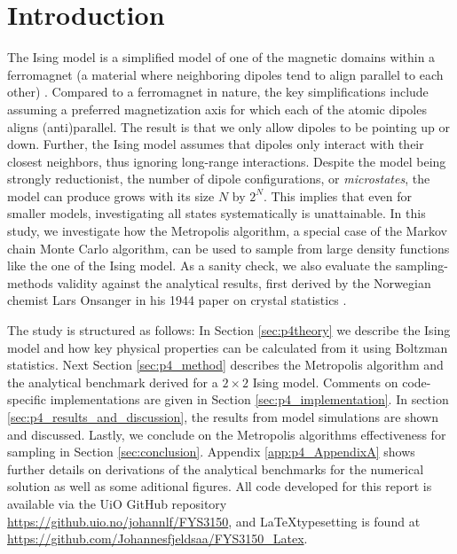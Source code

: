 \documentclass[../main_proj4_correct_template.tex]{subfiles}
\begin{document}
\section{Introduction}\label{Introduction}


The Ising model is a simplified model of one of the magnetic domains within a ferromagnet (a material where neighboring dipoles tend to align parallel to each other) \cite{thermal_physics}. Compared to a ferromagnet in nature, the key simplifications include assuming a preferred magnetization axis for which each of the atomic dipoles aligns (anti)parallel. The result is that we only allow dipoles to be pointing up or down. Further, the Ising model assumes that dipoles only interact with their closest neighbors, thus ignoring long-range interactions. Despite the model being strongly reductionist, the number of dipole configurations, or \textit{microstates}, the model can produce grows with its size $N$ by $2^{N}$. This implies that even for smaller models, investigating all states systematically is unattainable. In this study, we investigate how the Metropolis algorithm, a special case of the Markov chain Monte Carlo algorithm, can be used to sample from large density functions like the one of the Ising model. As a sanity check, we also evaluate the sampling-methods validity against the analytical results, first derived by the Norwegian chemist Lars Onsanger in his 1944 paper on crystal statistics \cite{onsanger_crystal_stat}.

The study is structured as follows: In Section \ref{sec:p4theory} we describe the Ising model and how key physical properties can be calculated from it using Boltzman statistics. Next Section \ref{sec:p4_method} describes the Metropolis algorithm and the analytical benchmark derived for a $2\times 2$ Ising model. Comments on code-specific implementations are given in Section \ref{sec:p4_implementation}. In section \ref{sec:p4_results_and_discussion}, the results from model simulations are shown and discussed. Lastly, we conclude on the Metropolis algorithms effectiveness for sampling in Section \ref{sec:conclusion}. Appendix \ref{app:p4_AppendixA} shows further details on derivations of the analytical benchmarks for the numerical solution as well as some aditional figures. All code developed for this report is available via the UiO GitHub repository \href{https://github.uio.no/johannlf/FYS3150}{https://github.uio.no/johannlf/FYS3150}, and \LaTeX typesetting is found at \href{https://github.com/Johannesfjeldsaa/FYS3150_Latex}{https://github.com/Johannesfjeldsaa/FYS3150\_Latex}.
\end{document}
